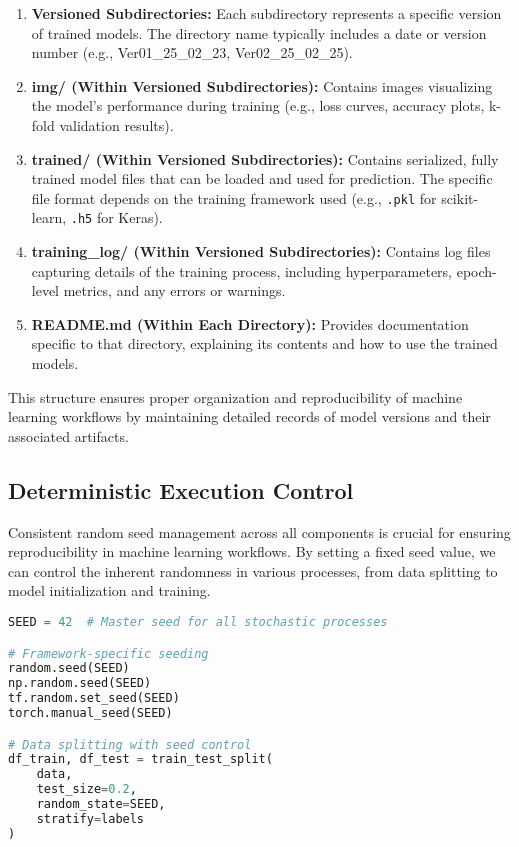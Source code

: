 \begin{enumerate}
    \item \textbf{Versioned Subdirectories:}  
    Each subdirectory represents a specific version of trained models. The directory name typically includes a date or version number (e.g., Ver01\_25\_02\_23, Ver02\_25\_02\_25).

    \item \textbf{img/ (Within Versioned Subdirectories):}  
    Contains images visualizing the model's performance during training (e.g., loss curves, accuracy plots, k-fold validation results).

    \item \textbf{trained/ (Within Versioned Subdirectories):}  
    Contains serialized, fully trained model files that can be loaded and used for prediction. The specific file format depends on the training framework used (e.g., \texttt{.pkl} for scikit-learn, \texttt{.h5} for Keras).

    \item \textbf{training\_log/ (Within Versioned Subdirectories):}  
    Contains log files capturing details of the training process, including hyperparameters, epoch-level metrics, and any errors or warnings.

    \item \textbf{README.md (Within Each Directory):}  
    Provides documentation specific to that directory, explaining its contents and how to use the trained models.
\end{enumerate}

This structure ensures proper organization and reproducibility of machine learning workflows by maintaining detailed records of model versions and their associated artifacts.


\subsection{Deterministic Execution Control}
Consistent random seed management across all components is crucial for ensuring reproducibility in machine learning workflows. By setting a fixed seed value, we can control the inherent randomness in various processes, from data splitting to model initialization and training.


\begin{lstlisting}[language=python,caption={Global Seed Configuration},label={lst:seeds}]
SEED = 42  # Master seed for all stochastic processes

# Framework-specific seeding
random.seed(SEED)
np.random.seed(SEED)
tf.random.set_seed(SEED)
torch.manual_seed(SEED)

# Data splitting with seed control
df_train, df_test = train_test_split(
    data, 
    test_size=0.2, 
    random_state=SEED, 
    stratify=labels
)
\end{lstlisting}

